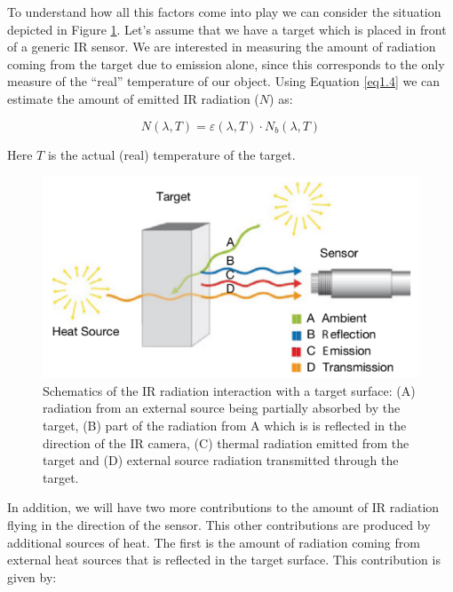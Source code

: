 		To understand how all this factors come into play we can consider the situation depicted in Figure \ref{fig1.6}.  Let's assume that we have a target which is placed in front of a generic IR sensor. We are interested in measuring the amount of radiation coming from the target due to emission alone, since this corresponds to the only measure of the “real” temperature of our object. Using Equation \ref{eq1.4} we can estimate the amount of emitted IR radiation ($N$) as: 
		
		\begin{equation}\label{eq1.8}
			N(\lambda,T)=\varepsilon(\lambda,T) \cdot N_{b}(\lambda, T)
		\end{equation}\bigskip
		
		Here $T$ is the actual (real) temperature of the target.
			
		\begin{figure}[ht!]
			\centering
			\captionsetup{justification=centering,margin=2cm}
			\includegraphics[scale=0.38]{Figures/Chapter01/SchematicsOfIRRadiation.pdf}
			\caption{Schematics of the IR radiation interaction with a target surface: (A) radiation from an external source being partially absorbed by the target, (B) part of the radiation from A which is is reflected in the direction of the IR camera, (C) thermal  radiation emitted from the target and (D) external source radiation transmitted through the target.}\label{fig1.6}
		\end{figure}
		
		In addition, we will have two more contributions to the amount of IR radiation flying in the direction of the sensor. This other contributions are produced by additional sources of heat. The first is the amount of radiation coming from external heat sources that is reflected in the target surface. This contribution is given by:
		
